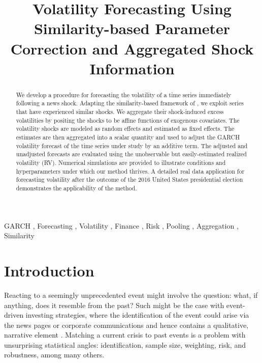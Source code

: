 \documentclass[11pt,3p,review,authoryear]{elsarticle}
\theoremstyle{definition}
\begin{document}
\begin{frontmatter}

\title{Volatility Forecasting Using Similarity-based Parameter Correction and Aggregated Shock Information}

\begin{abstract}
  We develop a procedure for forecasting the volatility of a time series immediately following a news shock.  Adapting the similarity-based framework of \citet{lin2021minimizing}, we exploit series that have experienced similar shocks.  We aggregate their shock-induced excess volatilities by positing the shocks to be affine functions of exogenous covariates.  The volatility shocks are modeled as random effects and estimated as fixed effects.  The estimates are then aggregated into a scalar quantity and used to adjust the GARCH volatility forecast of the time series under study by an additive term.  The adjusted and unadjusted forecasts are evaluated using the unobservable but easily-estimated realized volatility (RV). Numerical simulations are provided to illustrate conditions and hyperparameters under which our method thrives. A detailed real data application for forecasting volatility after the outcome of the 2016 United States presidential election demonstrates the applicability of the method.
\end{abstract}

\begin{keyword}
  GARCH \sep 
 Forecasting \sep 
 Volatility \sep 
Finance \sep
Risk \sep
Pooling \sep
Aggregation \sep
Similarity
\end{keyword}

\end{frontmatter}

\section{Introduction}

Reacting to a seemingly unprecedented event might involve the question: what, if anything, does it resemble from the past?  Such might be the case with event-driven investing strategies, where the identification of the event could arise via the news pages or corporate communications and hence contains a qualitative, narrative element \citep{Kenton}.  Matching a current crisis to past events is a problem with unsurprising statistical angles: identification, sample size, weighting, risk, and robustness, among many others.  
\end{document}
